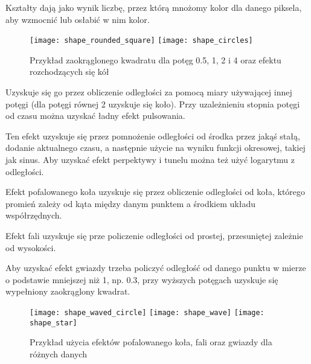 
Kształty dają jako wynik liczbę, przez którą mnożomy kolor dla danego piksela, aby wzmocnić lub osłabić w nim kolor.\bigskip

\begin{wrapfigure}{l}{0.55\textwidth}
	\centering
	\noindent\texttt{[image: shape\_rounded\_square]}
	\noindent\texttt{[image: shape\_circles]}
	\caption{Przykład zaokrąglonego kwadratu dla potęg 0.5, 1, 2 i 4 oraz efektu rozchodzących się kół}
\end{wrapfigure}


Uzyskuje się go przez obliczenie odległo\'sci za pomocą miary używającej innej potęgi (dla potęgi równej 2 uzyskuje się koło). Przy uzależnieniu stopnia potęgi od czasu można uzyskać ładny efekt pulsowania.\smallskip


Ten efekt uzyskuje się przez pomnożenie odległo\'sci od \'srodka przez jaką\'s stałą, dodanie aktualnego czasu, a następnie użycie na wyniku funkcji okresowej, takiej jak sinus. Aby uzyskać efekt perpektywy i tunelu można też użyć logarytmu z odległo\'sci.\smallskip\\


Efekt pofalowanego koła uzyskuje się przez obliczenie odległo\'sci od koła, którego promień zależy od kąta między danym punktem a \'srodkiem układu współrzędnych.\smallskip


Efekt fali uzyskuje się prze policzenie odległo\'sci od prostej, przesuniętej zależnie od wysoko\'sci.\smallskip


Aby uzyskać efekt gwiazdy trzeba policzyć odległo\'sć od danego punktu w mierze o podstawie mniejszej niż 1, np. 0.3, przy wyższych potęgach uzyskuje się wypełniony zaokrąglony kwadrat.

\begin{figure}[h]
	\centering
	\noindent\texttt{[image: shape\_waved\_circle]}
	\noindent\texttt{[image: shape\_wave]}
	\noindent\texttt{[image: shape\_star]}
	\caption{Przykład użycia efektów pofalowanego koła, fali oraz gwiazdy dla różnych danych}
\end{figure}\newpage

